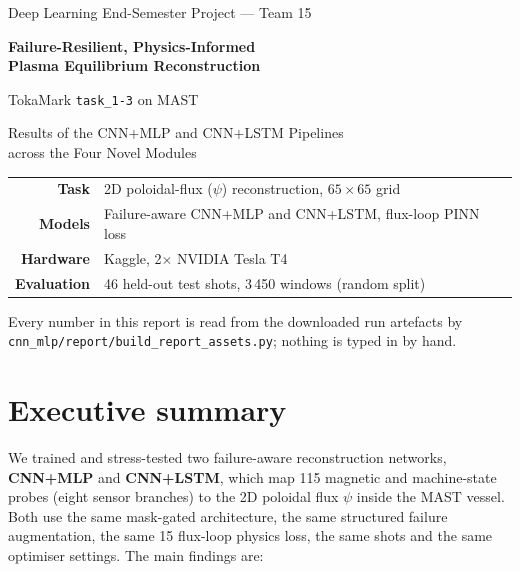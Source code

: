 \documentclass[11pt,a4paper]{article}
\newcommand{\mlp}{\textcolor{mlpblue}{\textbf{CNN+MLP}}}
\newcommand{\lstm}{\textcolor{lstmorange}{\textbf{CNN+LSTM}}}
\begin{document}
\begin{titlepage}
\centering
\vspace*{2.2cm}
{\large Deep Learning End-Semester Project --- Team 15\par}
\vspace{1.2cm}
{\Huge\bfseries Failure-Resilient, Physics-Informed\\[4pt] Plasma Equilibrium Reconstruction\par}
\vspace{0.6cm}
{\Large TokaMark \texttt{task\_1-3} on MAST\par}
\vspace{1.4cm}
{\LARGE Results of the CNN+MLP and CNN+LSTM Pipelines\\[4pt] across the Four Novel Modules\par}
\vspace{2.4cm}
\begin{tabular}{rl}
\textbf{Task} & 2D poloidal-flux ($\psi$) reconstruction, $65\times65$ grid\\
\textbf{Models} & Failure-aware CNN+MLP and CNN+LSTM, flux-loop PINN loss\\
\textbf{Hardware} & Kaggle, 2$\times$ NVIDIA Tesla T4\\
\textbf{Evaluation} & 46 held-out test shots, 3\,450 windows (random split)\\
\end{tabular}
\vfill
{\large Every number in this report is read from the downloaded run artefacts by\\
\texttt{cnn\_mlp/report/build\_report\_assets.py}; nothing is typed in by hand.\par}
\vspace{1cm}
\end{titlepage}

\tableofcontents
\clearpage

\section{Executive summary}
We trained and stress-tested two failure-aware reconstruction networks, \mlp{} and \lstm{}, which map 115 magnetic and
machine-state probes (eight sensor branches) to the 2D poloidal flux $\psi$ inside the MAST vessel. Both use the same
mask-gated architecture, the same structured failure augmentation, the same 15 flux-loop physics loss, the same
shots and the same optimiser settings. The main findings are:
\end{document}
